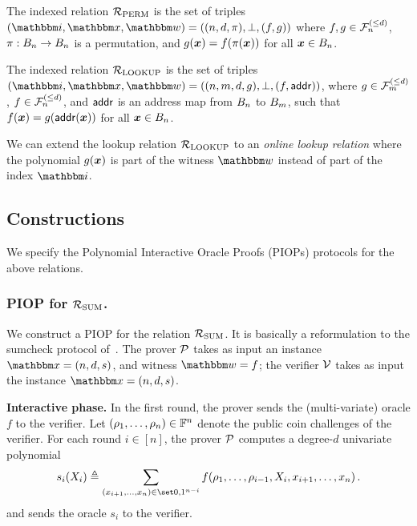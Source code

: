 \begin{definition}
    The indexed relation ${\mathcal{R}}_{\text{PERM}}$ is the set of triples $(\idxR, \instR, \witR)=
    ((n, d, \perm), \bot, (f, g))$ where $f, g \in {\mathcal{F}}_{n}^{(\le{d})}$, $\pi : B_{n} \rightarrow B_{n}$
    is a permutation, and $g(\boldsymbol{x}) = f(\pi(\boldsymbol{x}))$ for all $\boldsymbol{x} \in B_{n}$.
\end{definition}

\begin{definition}
    The indexed relation ${\mathcal{R}}_{\text{LOOKUP}}$ is the set of triples $(\idxR, \instR, \witR)=
    ((n, m, d, g), \bot, (f, \addr))$, where $g \in {\mathcal{F}}_{m}^{(\le{d})}$, $f \in {\mathcal{F}}_{n}^{(\le{d})}$,
    and $\mathsf{addr}$ is an address map from $B_{n}$ to $B_{m}$, such that 
    $f(\boldsymbol{x}) = g(\mathsf{addr}(\boldsymbol{x}))$ for all $\boldsymbol{x} \in B_{n}$.
\end{definition}

\begin{remark}
    We can extend the lookup relation ${\mathcal{R}}_{\text{LOOKUP}}$ to an \emph{online lookup relation}
    where the polynomial $g(\boldsymbol{x})$ is part of the witness $\witR$ 
    instead of part of the index $\idxR$.
\end{remark}

\subsection{Constructions}
We specify the Polynomial Interactive Oracle Proofs (PIOPs) protocols for the above relations.

\subsubsection*{PIOP for ${\mathcal{R}}_{\text{SUM}}$.} We construct a PIOP for 
the relation ${\mathcal{R}}_{\text{SUM}}$. It is basically a reformulation to the sumcheck protocol
of~\cite{LFKN92}.
The prover $\mathcal{P}$ takes as input an instance $\instR = (n, d, s)$,
and witness $\witR = f$; the verifier $\mathcal{V}$ takes as input the 
instance $\instR = (n, d, s)$.

\textbf{Interactive phase.} 
In the first round, the prover sends the (multi-variate) oracle $f$ to the verifier.
Let $(\rho_{1}, \dots, \rho_{n}) \in \mathbb{F}^{n}$ denote the public coin challenges
of the verifier.
For each round $i \in [n]$, the prover $\mathcal{P}$ computes a 
degree-$d$ univariate polynomial
\[
      s_i(X_i) \deq 
      \sum_{ (x_{i+1}, \dots, x_{n}) \in \zo^{n-i} } 
      f(\chal{1}, \dots, \chal{i-1}, X_i, x_{i+1}, \dots, x_n) \,.
\]
and sends the oracle $s_i$ to the verifier.

